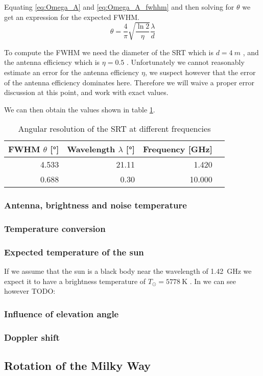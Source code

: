 Equating \eqref{eq:Omega_A} and \eqref{eq:Omega_A_fwhhm} and then solving for $\theta$ we get an expression for the expected FWHM.
\begin{equation}
    \theta = \frac{4}{\pi} \sqrt{\frac{\ln{2}}{\eta}}\frac{\lambda}{d} \label{eq:fwhm}
\end{equation}

To compute the FWHM we need the diameter of the SRT which is $d = \SI{4}{m}$ \cite[p. 4]{srt}, and the antenna efficiency which is $\eta = 0.5$ \cite[p. 2]{srt}.
Unfortunately we cannot reasonably estimate an error for the antenna efficiency $\eta$, we suspect however that the error of the antenna efficiency dominates here.
Therefore we will waive a proper error discussion at this point, and work with exact values.

We can then obtain the values shown in table \ref{tab:ang_res}.
\begin{table}[H]
    \centering
    \begin{tabular}{rrrr}
        \toprule
        FWHM $\theta$ [\si{\degree}] & Wavelength $\lambda$ [\si{\degree}] & Frequency [\si{\giga \hertz}]\\
        \midrule
        \num{4.533} & \num{21.11} & \num{1.420}\\
        \num{0.688} & \num{0.30} & \num{10.000}\\
        \bottomrule
    \end{tabular}
    \caption{Angular resolution of the SRT at different frequencies}
    \label{tab:ang_res}
\end{table}
\subsubsection{Antenna, brightness and noise temperature}

\subsubsection{Temperature conversion}

\subsubsection{Expected temperature of the sun}\label{sec:temp}
If we assume that the sun is a black body near the wavelength of \SI{1.42}{\giga\hertz} we expect it to have a brightness temperature of $T_{\odot} = \SI{5778}{\kelvin}$ \cite[p. 211]{ftb}.
In \cite[p.8-45 fig. 8-34]{kraus} we can see however TODO:

\subsubsection{Influence of elevation angle}


\subsubsection{Doppler shift}

\subsection{Rotation of the Milky Way}
